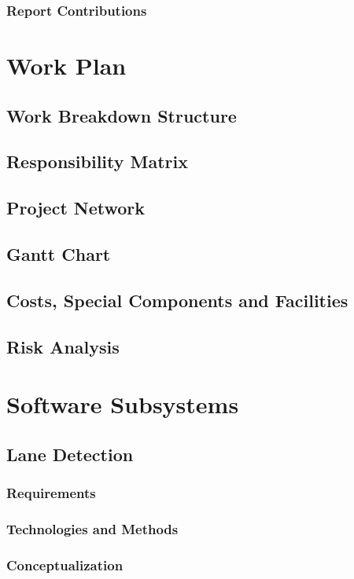 \documentclass[titlepage]{article}
\begin{document}
\subsubsection{Report Contributions}

\section{Work Plan}
\subsection{Work Breakdown Structure}
\subsection{Responsibility Matrix}
\subsection{Project Network}
\subsection{Gantt Chart}
\subsection{Costs, Special Components and Facilities}
\subsection{Risk Analysis}

\section{Software Subsystems}

\subsection{Lane Detection}

\subsubsection{Requirements}
\subsubsection{Technologies and Methods}
\subsubsection{Conceptualization}
\end{document}
